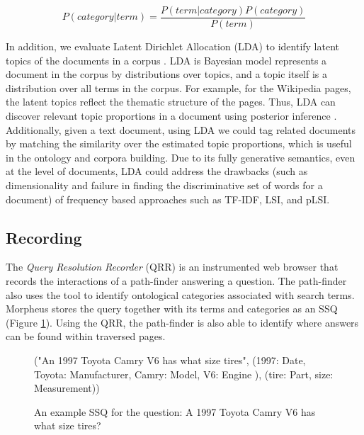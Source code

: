 
\begin{equation}
\label{eq:bayesrule}
P (category | term) = \frac{P(term | category) P(category)}{P(term)}
\end{equation}    

In addition, we evaluate Latent Dirichlet Allocation (LDA) to identify latent topics of the documents in a corpus \cite{Blei2003latentdirichlet}.  LDA is Bayesian model represents a document in the corpus by distributions over topics, and a topic itself is a distribution over all  terms in the corpus.  For example, for the Wikipedia pages, the latent topics reflect the thematic structure of the pages. Thus, LDA can discover relevant topic proportions in a document using posterior inference \cite{Blei2003latentdirichlet}. Additionally, given a text document, using LDA we could tag related documents by matching the similarity over the estimated topic proportions, which is useful in the ontology and corpora building.  Due to its fully generative semantics, even at the level of documents, LDA could address the drawbacks (such as dimensionality and failure in finding the discriminative set of words for a document) of frequency based approaches such as TF-IDF, LSI, and pLSI.


\subsection{ Recording}
\label{sec:query_processing}
  
The \emph{Query Resolution Recorder} (QRR) is an instrumented web browser that records the interactions of a path-finder answering a question. The path-finder also uses the tool to identify ontological categories associated with search terms. Morpheus stores the query together with its terms and categories as an SSQ (Figure \ref{fig:ssq_example}). Using the QRR, the path-finder is also able to identify where answers can be found within traversed pages.

\begin{figure}[t]
\label{fig:ssq_example}
("An  1997 Toyota Camry V6 has what size tires", 
     (1997: Date, Toyota: Manufacturer, Camry: Model, V6: Engine ),
     (tire: Part, size: Measurement))
 
\caption{An example SSQ for the question: A 1997 Toyota Camry V6 has what size tires?}
\end{figure} 

